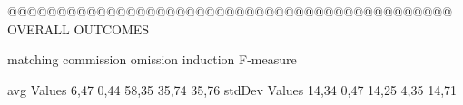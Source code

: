 @@@@@@@@@@@@@@@@@@@@@@@@@@@@@@@@@@@@@@@@@@@@@ OVERALL OUTCOMES

               matching commission   omission  induction  F-measure
               
avg Values      6,47       0,44       58,35      35,74     35,76        
stdDev Values   14,34       0,47       14,25     4,35      14,71        
